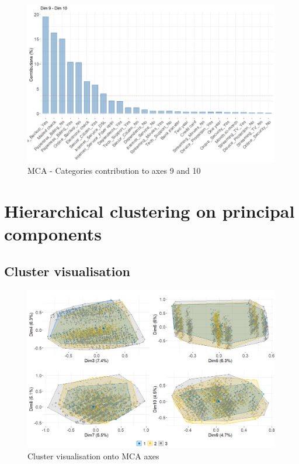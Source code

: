 \documentclass[
]{book}
\begin{document}
\begin{figure}

{\centering \includegraphics[width=15.28in]{./imgs/mca_contrib_910} 

}

\caption{MCA -  Categories contribution to axes 9 and 10}\label{fig:mcacontrib910}
\end{figure}

\hypertarget{hierarchical-clustering-on-principal-components-1}{%
\section*{Hierarchical clustering on principal components}\label{hierarchical-clustering-on-principal-components-1}}

\hypertarget{cluster-visualisation-1}{%
\subsection*{Cluster visualisation}\label{cluster-visualisation-1}}

\begin{figure}

{\centering \includegraphics[width=2\linewidth]{./imgs/cluster_plots} 

}

\caption{Cluster visualisation onto MCA axes}\label{fig:clusterplots}
\end{figure}

  
\end{document}
